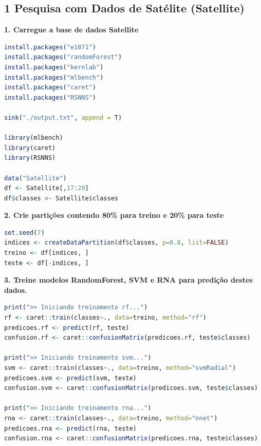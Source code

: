\subsection*{\textbf{1 Pesquisa com Dados de Satélite (Satellite)}}
\begin{adjustwidth}{1em}{}
\textbf{1. Carregue a base de dados Satellite}
\end{adjustwidth}
\begin{lstlisting}[language=R, style=input]
install.packages("e1071")
install.packages("randomForest")
install.packages("kernlab")
install.packages("mlbench")
install.packages("caret")
install.packages("RSNNS")

sink("./output.txt", append = T)

library(mlbench)
library(caret)
library(RSNNS)

data("Satellite")
df <- Satellite[,17:20]
df$classes <- Satellite$classes
\end{lstlisting}

\begin{adjustwidth}{1em}{}
\textbf{2. Crie partições contendo 80\% para treino e 20\% para teste}
\end{adjustwidth}
\begin{lstlisting}[language=R, style=input]
set.seed(7)
indices <- createDataPartition(df$classes, p=0.8, list=FALSE)
treino <- df[indices, ]
teste <- df[-indices, ]
\end{lstlisting}

\begin{adjustwidth}{1em}{}
\textbf{3. Treine modelos RandomForest, SVM e RNA para predição destes dados. }
\end{adjustwidth}
\begin{lstlisting}[language=R, style=input]
print(">> Iniciando treinamento rf...")
rf <- caret::train(classes~., data=treino, method="rf")
predicoes.rf <- predict(rf, teste)
confusion.rf <- caret::confusionMatrix(predicoes.rf, teste$classes)

print(">> Iniciando treinamento svm...")
svm <- caret::train(classes~., data=treino, method="svmRadial")
predicoes.svm <- predict(svm, teste)
confusion.svm <- caret::confusionMatrix(predicoes.svm, teste$classes)

print(">> Iniciando treinamento rna...")
rna <- caret::train(classes~., data=treino, method="nnet")
predicoes.rna <- predict(rna, teste)
confusion.rna <- caret::confusionMatrix(predicoes.rna, teste$classes)
\end{lstlisting}

